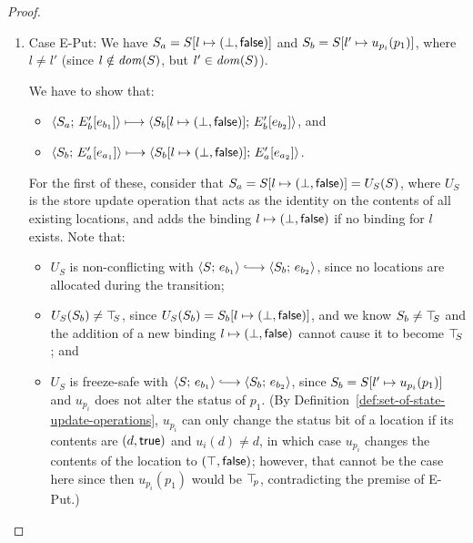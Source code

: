 \begin{proof}
\begin{enumerate}
\begin{enumerate}
\begin{itemize}

      \end{itemize}

    \item \label{slqc-new-put}Case {\sc E-Put}: We have $S_a =
      S[l \mapsto (\bot, \textsf{false})]$ and $S_b =
      S[l' \mapsto u_{p_i}(p_1)]$, where $l \neq l'$ (since $l
      \notin \mathit{dom}(S)$, but $l' \in \mathit{dom}(S)$).

      We have to show that:
      \begin{itemize}
      \item $\langle S_a;\, E'_b\hspace{-0.5mm}\left[e_{b_1}\right] \rangle \longmapsto
        \langle S_b[l \mapsto (\bot, \textsf{false})];\, E'_b\hspace{-0.5mm}\left[e_{b_2}\right] \rangle$,
        and
      \item $\langle S_b;\, E'_a\hspace{-0.5mm}\left[e_{a_1}\right] \rangle \longmapsto
        \langle S_b[l \mapsto (\bot, \textsf{false})];\, E'_a\hspace{-0.5mm}\left[e_{a_2}\right] \rangle$.
      \end{itemize}

      For the first of these, consider that $S_a =
      S[l \mapsto (\bot, \textsf{false})] = U_S(S)$, where $U_S$ is the
      store update operation that acts as the identity on the contents
      of all existing locations, and adds the binding
      $l \mapsto (\bot, \textsf{false})$ if no binding for $l$
      exists.  Note that:
      \begin{itemize}
      \item $U_S$ is non-conflicting with $\config{S}{e_{b_1}}
        \parstepsto \config{S_b}{e_{b_2}}$, since no locations are
        allocated during the transition;
      \item $U_S(S_b) \neq \top\hspace{-0.85mm}_{S}$, since $U_S(S_b) =
        S_b[l \mapsto (\bot, \textsf{false})]$, and we know $S_b \neq
        \top\hspace{-0.85mm}_{S}$ and the addition of a new binding
        $l \mapsto (\bot, \textsf{false})$ cannot cause it to
        become $\top\hspace{-0.85mm}_{S}$; and
      \item $U_S$ is freeze-safe with $\config{S}{e_{b_1}} \parstepsto
        \config{S_b}{e_{b_2}}$, since $S_b =
        S[l' \mapsto u_{p_i}(p_1)]$ and $u_{p_i}$ does not alter
        the status of $p_1$.  (By
        Definition~\ref{def:set-of-state-update-operations}, $u_{p_i}$
        can only change the status bit of a location if its contents
        are $(d, \textsf{true})$ and $u_i(d) \neq d$, in which
        case $u_{p_i}$ changes the contents of the location to
        $(\top, \textsf{false})$; however, that cannot be the case
        here since then $u_{p_i}(p_1)$ would be $\top\hspace{-0.85mm}_{p}$, contradicting
        the premise of {\sc E-Put}.)
      \end{itemize}


\end{enumerate}
\end{enumerate}
\end{proof}
